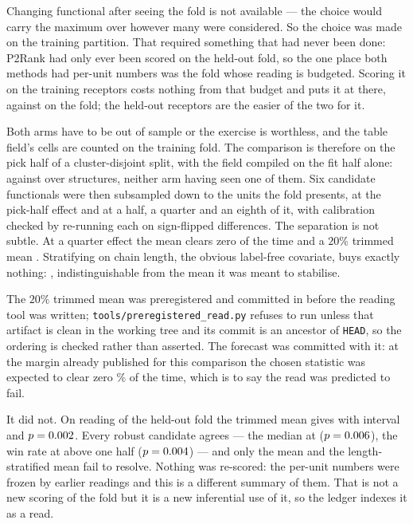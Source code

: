 \documentclass[11pt]{article}
\begin{document}
Changing functional after seeing the fold is not available --- the choice would
carry the maximum over however many were considered. So the choice was made on
the training partition. That required something that had never been done:
P2Rank had only ever been scored on the held-out fold, so the one place both
methods had per-unit numbers was the fold whose reading is budgeted. Scoring it
on the \PTwoTrainUnits{} training receptors costs nothing from that budget and
puts it at \PTwoTrainAuc{} there, against \AlgAucMatchedBase{} on the fold; the
held-out receptors are the easier of the two for it.

Both arms have to be out of sample or the exercise is worthless, and the table
field's cells are counted on the training fold. The comparison is therefore on
the pick half of a cluster-disjoint split, with the field compiled on the fit
half alone: \PreRegFieldPick{} against \PreRegPTwoPick{} over \PreRegNPick{}
structures, neither arm having seen one of them. Six candidate functionals were
then subsampled down to the \NUnits{} units the fold presents, at the
pick-half effect and at a half, a quarter and an eighth of it, with calibration
checked by re-running each on sign-flipped differences. The separation is not
subtle. At a quarter effect the mean clears zero \PreRegMeanPowerQuarter{} of
the time and a \(20\%\) trimmed mean \PreRegTrimPowerQuarter{}. Stratifying on
chain length, the obvious label-free covariate, buys exactly nothing:
\PreRegStratPowerQuarter{}, indistinguishable from the mean it was meant to
stabilise.

The \(20\%\) trimmed mean was preregistered and committed in \PreRegCommit{}
before the reading tool was written; \texttt{tools/preregistered\_read.py}
refuses to run unless that artifact is clean in the working tree and its commit
is an ancestor of \texttt{HEAD}, so the ordering is checked rather than
asserted. The forecast was committed with it: at the margin already published
for this comparison the chosen statistic was expected to clear zero
\PreRegForecast{}\% of the time, which is to say the read was predicted to fail.

It did not. On reading \PreRegReadIndex{} of the held-out fold the trimmed mean
gives \PreRegTestDelta{} with interval \PreRegTestCI{} and
\(p = 0.002{}\). Every robust candidate agrees --- the median at
\PreRegTestMedian{} (\(p = 0.006{}\)), the win rate at
\PreRegTestWinRate{} above one half (\(p = 0.004{}\)) --- and only
the mean and the length-stratified mean fail to resolve. Nothing was re-scored:
the per-unit numbers were frozen by earlier readings and this is a different
summary of them. That is not a new scoring of the fold but it is a new
inferential use of it, so the ledger indexes it as a read.
\end{document}
